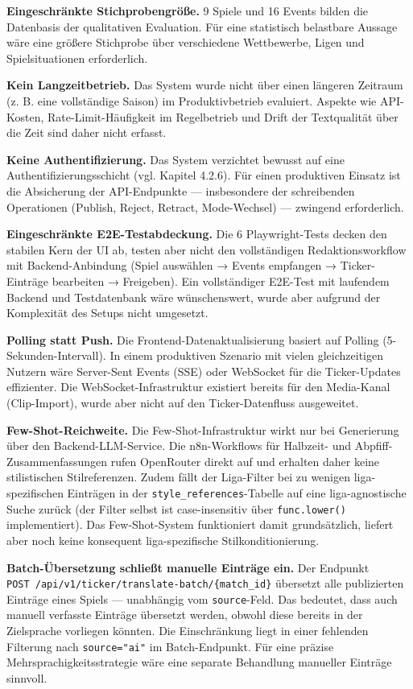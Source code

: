 \textbf{Eingeschränkte Stichprobengröße.} 9 Spiele und 16 Events bilden
die Datenbasis der qualitativen Evaluation. Für eine statistisch
belastbare Aussage wäre eine größere Stichprobe über verschiedene
Wettbewerbe, Ligen und Spielsituationen erforderlich.

\textbf{Kein Langzeitbetrieb.} Das System wurde nicht über einen
längeren Zeitraum (z. B. eine vollständige Saison) im Produktivbetrieb
evaluiert. Aspekte wie API-Kosten, Rate-Limit-Häufigkeit im Regelbetrieb
und Drift der Textqualität über die Zeit sind daher nicht erfasst.

\textbf{Keine Authentifizierung.} Das System verzichtet bewusst auf eine
Authentifizierungsschicht (vgl. Kapitel 4.2.6). Für einen produktiven
Einsatz ist die Absicherung der API-Endpunkte --- insbesondere der
schreibenden Operationen (Publish, Reject, Retract, Mode-Wechsel) ---
zwingend erforderlich.

\textbf{Eingeschränkte E2E-Testabdeckung.} Die 6 Playwright-Tests decken
den stabilen Kern der UI ab, testen aber nicht den vollständigen
Redaktionsworkflow mit Backend-Anbindung (Spiel auswählen → Events
empfangen → Ticker-Einträge bearbeiten → Freigeben). Ein vollständiger
E2E-Test mit laufendem Backend und Testdatenbank wäre wünschenswert,
wurde aber aufgrund der Komplexität des Setups nicht umgesetzt.

\textbf{Polling statt Push.} Die Frontend-Datenaktualisierung basiert
auf Polling (5-Sekunden-Intervall). In einem produktiven Szenario mit
vielen gleichzeitigen Nutzern wäre Server-Sent Events (SSE) oder
WebSocket für die Ticker-Updates effizienter. Die
WebSocket-Infrastruktur existiert bereits für den Media-Kanal
(Clip-Import), wurde aber nicht auf den Ticker-Datenfluss ausgeweitet.

\textbf{Few-Shot-Reichweite.} Die Few-Shot-Infrastruktur wirkt nur bei
Generierung über den Backend-LLM-Service. Die n8n-Workflows für
Halbzeit- und Abpfiff-Zusammenfassungen rufen OpenRouter direkt auf und
erhalten daher keine stilistischen Stilreferenzen. Zudem fällt der
Liga-Filter bei zu wenigen liga-spezifischen Einträgen in der
\texttt{style\_references}-Tabelle auf eine liga-agnostische Suche
zurück (der Filter selbst ist case-insensitiv über \texttt{func.lower()}
implementiert). Das Few-Shot-System funktioniert damit grundsätzlich,
liefert aber noch keine konsequent liga-spezifische Stilkonditionierung.

\textbf{Batch-Übersetzung schließt manuelle Einträge ein.} Der Endpunkt
\texttt{POST\ /api/v1/ticker/translate-batch/\{match\_id\}} übersetzt
alle publizierten Einträge eines Spiels --- unabhängig vom
\texttt{source}-Feld. Das bedeutet, dass auch manuell verfasste Einträge
übersetzt werden, obwohl diese bereits in der Zielsprache vorliegen
könnten. Die Einschränkung liegt in einer fehlenden Filterung nach
\texttt{source="ai"} im Batch-Endpunkt. Für eine präzise
Mehrsprachigkeitsstrategie wäre eine separate Behandlung manueller
Einträge sinnvoll.

